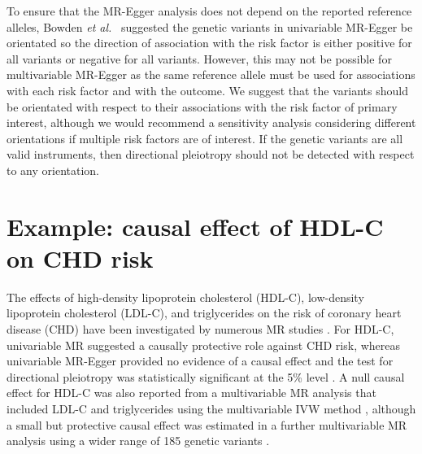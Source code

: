 \documentclass[a4paper,12pt]{article}
\begin{document}
\begin{bibunit}[wileyj]
To ensure that the MR-Egger analysis does not depend on the reported reference alleles, Bowden \textit{et al.}\ \cite{bowden2015egger} suggested the genetic variants in univariable MR-Egger be orientated so the direction of association with the risk factor is either positive for all variants or negative for all variants. However, this may not be possible for multivariable MR-Egger as the same reference allele must be used for associations with each risk factor and with the outcome. We suggest that the variants should be orientated with respect to their associations with the risk factor of primary interest, although we would recommend a sensitivity analysis considering different orientations if multiple risk factors are of interest. If the genetic variants are all valid instruments, then directional pleiotropy should not be detected with respect to any orientation.
\clearpage
\section{Example: causal effect of HDL-C on CHD risk} %
\label{sec:example}
The effects of high-density lipoprotein cholesterol (HDL-C), low-density lipoprotein cholesterol (LDL-C), and triglycerides on the risk of coronary heart disease (CHD) have been investigated by numerous MR studies \cite{burgess2016lipids}. For HDL-C, univariable MR suggested a causally protective role against CHD risk, whereas univariable MR-Egger provided no evidence of a causal effect and the test for directional pleiotropy was statistically significant at the 5\% level \cite{bowden2016consistent}. A null causal effect for HDL-C was also reported from a multivariable MR analysis that included LDL-C and triglycerides using the multivariable IVW method \cite{burgess2015multivariable}, although a small but protective causal effect was estimated in a further multivariable MR analysis using a wider range of 185 genetic variants \cite{burgess2014multilipid}.


\end{bibunit}
\end{document}
